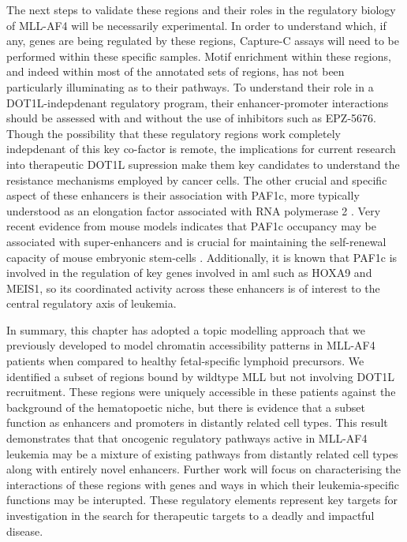 The next steps to validate these regions and their roles in the regulatory biology of MLL-AF4 will be necessarily experimental. In order to understand which, if any, genes are being regulated by these regions, Capture-C assays will need to be performed within these specific samples. Motif enrichment within these regions, and indeed within most of the annotated sets of regions, has not been particularly illuminating as to their pathways. To understand their role in a DOT1L-indepdenant regulatory program, their enhancer-promoter interactions should be assessed with and without the use of inhibitors such as EPZ-5676. Though the possibility that these regulatory regions work completely indepdenant of this key co-factor is remote, the implications for current research into therapeutic DOT1L supression make them key candidates to understand the resistance mechanisms employed by cancer cells. The other crucial and specific aspect of these enhancers is their association with PAF1c, more typically understood as an elongation factor associated with RNA polymerase 2 \cite{Oss2017,Yang2016,Hou2019,Jaehning2010}. Very recent evidence from mouse models indicates that PAF1c occupancy may be associated with super-enhancers and is crucial for maintaining the self-renewal capacity of mouse embryonic stem-cells \cite{Ding2021}. Additionally, it is known that PAF1c is involved in the regulation of key genes involved in \gls{aml} such as HOXA9 and MEIS1, so its coordinated activity across these enhancers is of interest to the central regulatory axis of leukemia. 

In summary, this chapter has adopted a topic modelling approach that we previously developed to model chromatin accessibility patterns in MLL-AF4 patients when compared to healthy fetal-specific lymphoid precursors. We identified a subset of regions bound by wildtype MLL but not involving DOT1L recruitment. These regions were uniquely accessible in these patients against the background of the hematopoetic niche, but there is evidence that a subset function as enhancers and promoters in distantly related cell types. This result demonstrates that that oncogenic regulatory pathways active in MLL-AF4 leukemia may be a mixture of existing pathways from distantly related cell types along with entirely novel enhancers. Further work will focus on characterising the interactions of these regions with genes and ways in which their leukemia-specific functions may be interupted. These regulatory elements represent key targets for investigation in the search for therapeutic targets to a deadly and impactful disease.  


